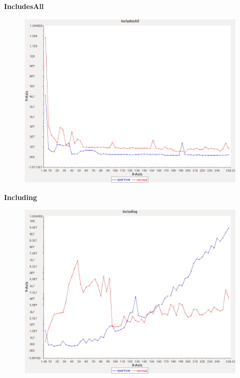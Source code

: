 \noindent\textbf{IncludesAll}

\begin{figure}[h]
\centering
\includegraphics[width=\textwidth]{graphs/set/IncludesAll}
\end{figure}
\pagebreak

\noindent\textbf{Including}

\begin{figure}[h]
\centering
\includegraphics[width=\textwidth]{graphs/set/Including}
\end{figure}
\pagebreak

